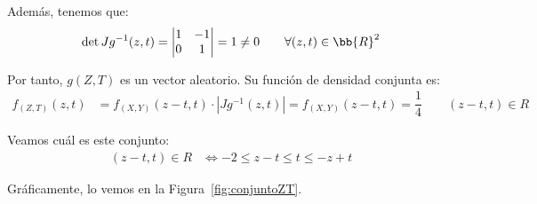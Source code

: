 \documentclass[12pt]{article}
\begin{document}
\begin{ejercicio}
\begin{enumerate}
            Además, tenemos que:
            \begin{equation*}
                \det Jg^{-1}(z,t) = \begin{vmatrix}
                    1 & -1\\
                    0 & 1
                \end{vmatrix} = 1\neq 0\qquad \forall (z,t)\in \bb{R}^2
            \end{equation*}

            Por tanto, $g(Z,T)$ es un vector aleatorio. Su función de densidad conjunta es:
            \begin{align*}
                f_{(Z,T)}(z,t) &= f_{(X,Y)}(z-t,t) \cdot |Jg^{-1}(z,t)| = f_{(X,Y)}(z-t,t) = \dfrac{1}{4}\qquad (z-t,t)\in R
            \end{align*}

            Veamos cuál es este conjunto:
            \begin{align*}
                (z-t,t) \in R &\Longleftrightarrow -2\leq z-t\leq t\leq -z+t
            \end{align*}

            Gráficamente, lo vemos en la Figura~\ref{fig:conjuntoZT}.
            \begin{figure}[H]
                \centering
\end{figure}
\end{enumerate}
\end{ejercicio}
\end{document}
